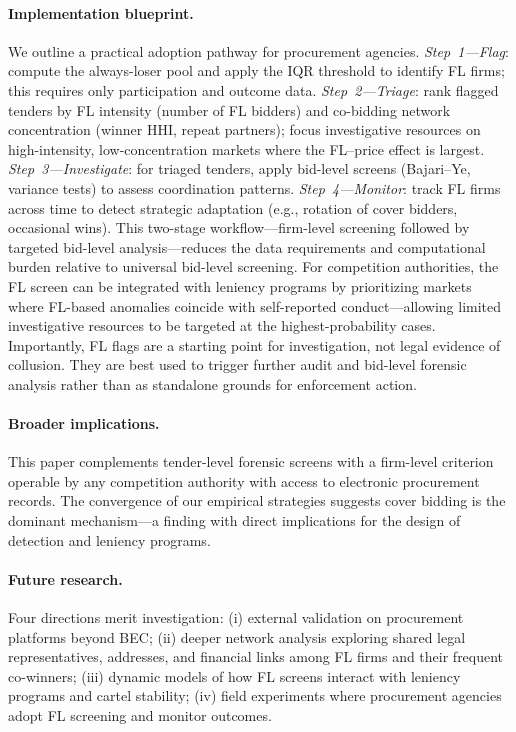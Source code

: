 \paragraph{Implementation blueprint.}
We outline a practical adoption pathway for procurement agencies.
\emph{Step~1---Flag}: compute the always-loser pool and apply the IQR
threshold to identify FL firms; this requires only participation and
outcome data. \emph{Step~2---Triage}: rank flagged tenders by FL
intensity (number of FL bidders) and co-bidding network concentration
(winner HHI, repeat partners); focus investigative resources on
high-intensity, low-concentration markets where the FL--price effect is
largest. \emph{Step~3---Investigate}: for triaged tenders, apply
bid-level screens (Bajari--Ye, variance tests) to assess coordination
patterns. \emph{Step~4---Monitor}: track FL firms across time to detect
strategic adaptation (e.g., rotation of cover bidders, occasional
wins). This two-stage workflow---firm-level screening followed by
targeted bid-level analysis---reduces the data requirements and
computational burden relative to universal bid-level screening.
For competition authorities, the FL screen can be integrated with
leniency programs by prioritizing markets where FL-based anomalies
coincide with self-reported conduct---allowing limited investigative
resources to be targeted at the highest-probability cases. Importantly,
FL flags are a starting point for investigation, not legal evidence of
collusion. They are best used to trigger further audit and bid-level
forensic analysis rather than as standalone grounds for enforcement
action.

\paragraph{Broader implications.}
This paper complements tender-level forensic screens with a firm-level
criterion operable by any competition authority with access to electronic
procurement records. The convergence of our empirical strategies suggests
cover bidding is the dominant mechanism---a finding with direct
implications for the design of detection and leniency programs.

\paragraph{Future research.}
Four directions merit investigation: (i) external validation on
procurement platforms beyond BEC; (ii) deeper network analysis exploring
shared legal representatives, addresses, and financial links among FL
firms and their frequent co-winners; (iii) dynamic models of how FL
screens interact with leniency programs and cartel stability; (iv)
field experiments where procurement agencies adopt FL screening and
monitor outcomes.
